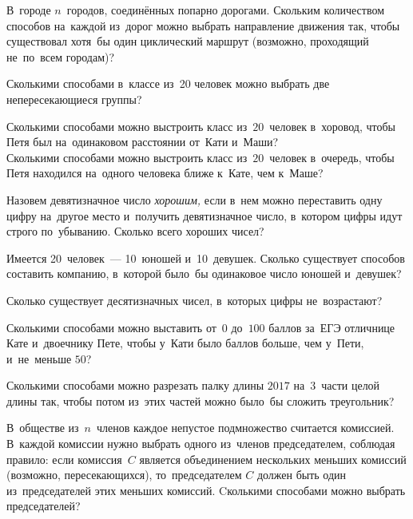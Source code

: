 


\begin{problems}

\item
В~городе $n$~городов, соединённых попарно дорогами.
Скольким количеством способов на~каждой из~дорог можно выбрать направление
движения так, чтобы существовал хотя~бы один циклический маршрут
(возможно, проходящий не~по~всем городам)?

\item
Сколькими способами в~классе из~20 человек можно выбрать две непересекающиеся
группы?

\item
\subproblem
Сколькими способами можно выстроить класс из~$20$~человек в~хоровод, чтобы Петя
был на~одинаковом расстоянии от~Кати и~Маши?
\\
\subproblem
Сколькими способами можно выстроить класс из~$20$~человек в~очередь, чтобы
Петя находился на~одного человека ближе к~Кате, чем к~Маше?

\item
Назовем девятизначное число \emph{хорошим,} если в~нем можно переставить одну
цифру на~другое место и~получить девятизначное число, в~котором цифры идут
строго по~убыванию.
Сколько всего хороших чисел?

\item
Имеется 20~человек~--- 10~юношей и~10~девушек.
Сколько существует способов составить компанию, в~которой было~бы одинаковое
число юношей и~девушек?

\item
Сколько существует десятизначных чисел, в~которых цифры не~возрастают?

\item
Сколькими способами можно выставить от~$0$ до~$100$ баллов за~ЕГЭ
отличнице Кате и~двоечнику Пете, чтобы у~Кати было баллов больше, чем у~Пети,
и~не~меньше $50$?

\item
Сколькими способами можно разрезать палку длины $2017$ на~$3$~части целой длины
так, чтобы потом из~этих частей можно было~бы сложить треугольник?

\item
В~обществе из~$n$~членов каждое непустое подмножество считается комиссией.
В~каждой комиссии нужно выбрать одного из~членов председателем, соблюдая
правило: если комиссия~$C$ является объединением нескольких меньших комиссий
(возможно, пересекающихся), то~председателем $C$ должен быть один
из~председателей этих меньших комиссий.
Cколькими способами можно выбрать председателей?


\end{problems}
